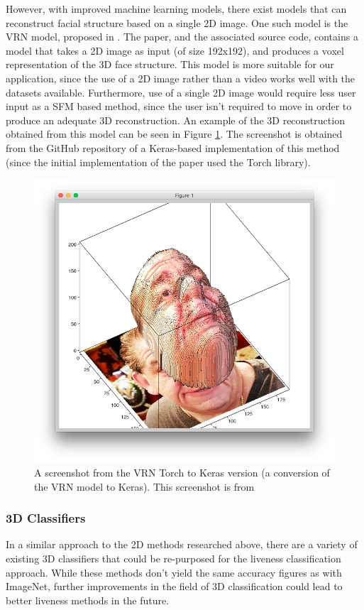 \documentclass[10pt,a4paper]{article}
\begin{document}
            However, with improved machine learning models, there exist models that can reconstruct facial structure based on a single 2D image. One such model is the VRN model, proposed in \cite{3DReconstructionMethod}.
            The paper, and the associated source code, contains a model that takes a 2D image as input (of size 192x192), and produces a voxel representation of the 3D face structure. This model is more suitable for our
            application, since the use of a 2D image rather than a video works well with the datasets available. Furthermore, use of a single 2D image would require less user input as a SFM based method, since the user isn't required
            to move in order to produce an adequate 3D reconstruction. An example of the 3D reconstruction obtained from this model can be seen in Figure \ref{3DReconstructionScreenshot}. The screenshot is obtained from the GitHub repository
            of a Keras-based implementation of this method (since the initial implementation of the paper used the Torch library).

            \begin{figure}
                \centering
                \includegraphics[width=.5\linewidth]{3DReconstructionFromSource}
                \caption{A screenshot from the VRN Torch to Keras version (a conversion of the VRN model to Keras). This screenshot is from \cite{VRNTorchToKeras}}
                \label{3DReconstructionScreenshot}
            \end{figure}


        \subsubsection{3D Classifiers}
            In a similar approach to the 2D methods researched above, there are a variety of existing 3D classifiers that could be re-purposed for the liveness classification approach.
            While these methods don't yield the same accuracy figures as with ImageNet, further improvements in the field of 3D classification could lead to better liveness methods in the future.
\end{document}
